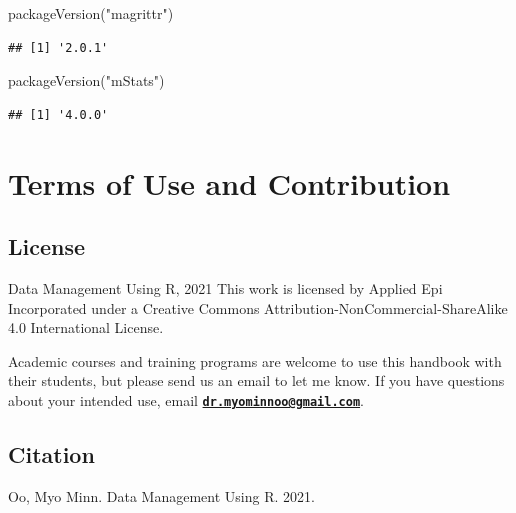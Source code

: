 \documentclass[
]{book}
\newenvironment{Shaded}{\begin{snugshade}}{\end{snugshade}}
\newcommand{\FunctionTok}[1]{\textcolor[rgb]{0.00,0.00,0.00}{#1}}
\newcommand{\NormalTok}[1]{#1}
\newcommand{\StringTok}[1]{\textcolor[rgb]{0.31,0.60,0.02}{#1}}
\begin{document}
\begin{Shaded}
\begin{Highlighting}[]
\FunctionTok{packageVersion}\NormalTok{(}\StringTok{"magrittr"}\NormalTok{)}
\end{Highlighting}
\end{Shaded}

\begin{verbatim}
## [1] '2.0.1'
\end{verbatim}

\begin{Shaded}
\begin{Highlighting}[]
\FunctionTok{packageVersion}\NormalTok{(}\StringTok{"mStats"}\NormalTok{)}
\end{Highlighting}
\end{Shaded}

\begin{verbatim}
## [1] '4.0.0'
\end{verbatim}

\hypertarget{terms-of-use-and-contribution}{%
\section*{Terms of Use and Contribution}\label{terms-of-use-and-contribution}}

\hypertarget{license}{%
\subsection*{License}\label{license}}

Data Management Using R, 2021 This work is licensed by Applied Epi Incorporated under a Creative Commons Attribution-NonCommercial-ShareAlike 4.0 International License.

Academic courses and training programs are welcome to use this handbook with their students, but please send us an email to let me know. If you have questions about your intended use, email \textbf{\href{mailto:dr.myominnoo@gmail.com}{\nolinkurl{dr.myominnoo@gmail.com}}}.

\hypertarget{citation}{%
\subsection*{Citation}\label{citation}}

Oo, Myo Minn. Data Management Using R. 2021.
\end{document}
